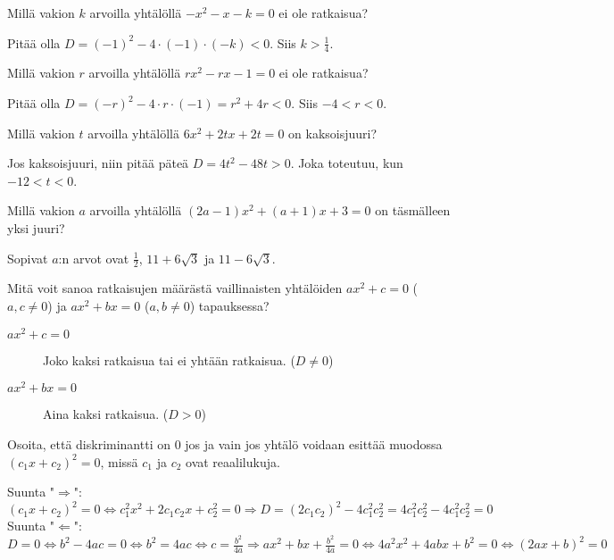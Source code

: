 \begin{tehtavasivu}
\begin{tehtava}
	Millä vakion $k$ arvoilla yhtälöllä $-x^2-x-k = 0$ ei ole ratkaisua?
	\begin{vastaus}
		Pitää olla $D=(-1)^2-4 \cdot (-1) \cdot (-k)<0$. Siis $k>\frac{1}{4}$.
	\end{vastaus}
\end{tehtava}

\begin{tehtava}
	Millä vakion $r$ arvoilla yhtälöllä $rx^2-rx-1 = 0$ ei ole ratkaisua?
	\begin{vastaus}
		Pitää olla $D=(-r)^2-4 \cdot r \cdot (-1)=r^2+4r<0$. Siis $-4 < r < 0$.
	\end{vastaus}
\end{tehtava}

\begin{tehtava}
	Millä vakion $t$ arvoilla yhtälöllä $6x^2+2tx+2t=0$ on kaksoisjuuri?
	\begin{vastaus}
		Jos kaksoisjuuri, niin pitää päteä $D=4t^2-48t>0$. Joka toteutuu, kun $-12 < t < 0$.
	\end{vastaus}
\end{tehtava}

\begin{tehtava}
	Millä vakion $a$ arvoilla yhtälöllä $(2a-1)x^2+(a+1)x+3=0$ on täsmälleen yksi juuri?
	\begin{vastaus}
		Sopivat $a$:n arvot ovat $\frac{1}{2}$, $11+6\sqrt{3}$ ja $11-6\sqrt{3}$.
	\end{vastaus}
\end{tehtava}

\begin{tehtava}
	Mitä voit sanoa ratkaisujen määrästä vaillinaisten yhtälöiden $ax^2+c=0$ ($a, c \neq 0$) ja $ax^2+bx=0$ ($a, b \neq 0$) tapauksessa?
	\begin{vastaus}
		\begin{description}
			\item[$ax^2+c=0$] Joko kaksi ratkaisua tai ei yhtään ratkaisua. ($D \neq 0$)
			\item[$ax^2+bx=0$] Aina kaksi ratkaisua. ($D > 0$)
		\end{description}
	\end{vastaus}
\end{tehtava}

\begin{tehtava}
	Osoita, että diskriminantti on $0$ jos ja vain jos yhtälö voidaan esittää muodossa $(c_1 x+ c_2)^2=0$, missä $c_1$ ja $c_2$ ovat reaalilukuja.
	\begin{vastaus}
		Suunta "$\Rightarrow$": $(c_1 x+ c_2)^2=0 \Leftrightarrow c_1^2 x^2 + 2c_1 c_2 x+ c_2^2 =0 \Rightarrow
		D=(2 c_1 c_2)^2-4 c_1^2 c_2^2 =4 c_1^2 c_2^2 -4 c_1^2 c_2^2 =0$ \\
		Suunta "$\Leftarrow$": $D=0 \Leftrightarrow b^2-4ac=0 \Leftrightarrow b^2=4ac \Leftrightarrow c=\frac{b^2}{4a} \Rightarrow ax^2+bx+\frac{b^2}{4a}=0 \Leftrightarrow 4a^2x^2+4abx+b^2=0 \Leftrightarrow (2ax+b)^2=0$
	\end{vastaus}
\end{tehtava}

\end{tehtavasivu}
